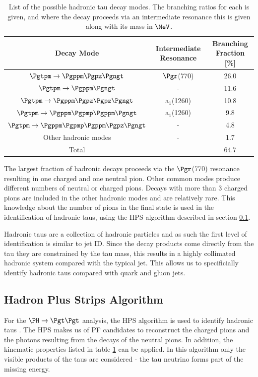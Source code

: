 \begin{table}[bth]
\begin{tabular}{|c|c|c|}
Decay Mode & Intermediate Resonance & Branching Fraction [\%] \\
\hline
$\Pgtpm\to\Pgppm\Pgpz\Pgngt$ & $\Pgr$(770) & 26.0 \\
\hline
$\Pgtpm\to\Pgppm\Pgngt$ & -  & 11.6 \\
\hline
$\Pgtpm\to\Pgppm\Pgpz\Pgpz\Pgngt$ & $\text{a}_{1}$(1260) & 10.8 \\
\hline
$\Pgtpm\to\Pgppm\Pgpmp\Pgppm\Pgngt$ & $\text{a}_{1}$(1260) & 9.8 \\
\hline
$\Pgtpm\to\Pgppm\Pgpmp\Pgppm\Pgpz\Pgngt$ & -  & 4.8 \\
\hline
Other hadronic modes & - & 1.7 \\
\hline
Total & &  64.7 \\ 
\end{tabular}
\caption{List of the possible hadronic tau decay modes. The branching ratios for
each is given, and where the decay proceeds via an intermediate resonance this
is given along with its mass in $\MeV$\cite{PDG}.}
\label{tab:hadronictaus}
\end{table}

The largest fraction of hadronic decays proceeds via the $\Pgr$(770) resonance
resulting in one charged and one neutral pion. Other common modes produce
different numbers of neutral or charged pions. Decays with more than 3 charged
pions are included in the other hadronic modes and are relatively rare. This
knowledge about the number of pions in the final state is used in the
identification of hadronic taus, using the \ac{HPS} algorithm
described in section \ref{sec:hps}.

Hadronic taus are a collection of hadronic particles and as such the first level
of identification is similar to jet ID. 
Since the decay products come directly from the tau they are constrained by the
tau mass, this results in a highly collimated hadronic system compared with the
typical jet. This allows us to specificially identify hadronic taus compared
with quark and gluon jets.

\subsection{Hadron Plus Strips Algorithm}
\label{sec:hps}

For the $\PH \to \Pgt\Pgt$ analysis, the \ac{HPS} algorithm is used to identify
hadronic taus \cite{CMS-PAS-TAU-11-001}. The \ac{HPS} makes us of \ac{PF} candidates to reconstruct the
charged pions and the photons resulting from the decays of the neutral pions. In
addition, the kinematic properties listed in table \ref{tab:hadronictaus} can be
applied. In this algorithm only the visible products of the taus are considered
- the tau neutrino forms part of the missing energy.

